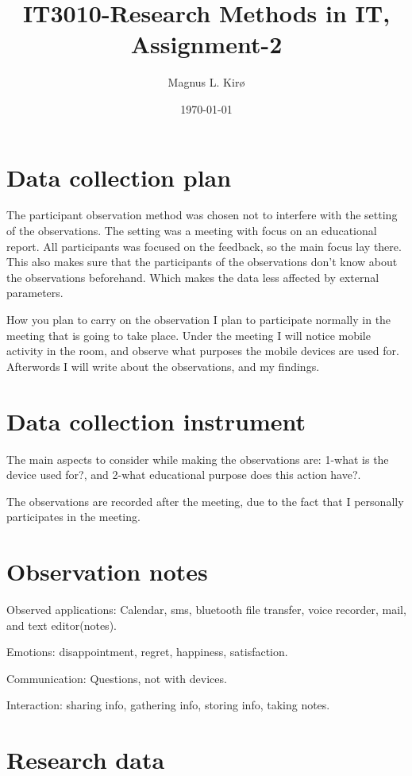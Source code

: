 \documentclass[12pt, a4paper]{article}
\title{
	IT3010-Research Methods in IT, Assignment-2
}
\author{
	Magnus L. Kirø
}
\date{\today}
\begin{document}
\maketitle
{}

\section{Data collection plan}
The participant observation method was chosen not to interfere with the setting
of the observations. The setting was a meeting with focus on an educational
report. All participants was focused on the feedback, so the main focus lay
there. This also makes sure that the participants of the observations don't
know about the observations beforehand. Which makes the data less affected by
external parameters. 

How you plan to carry on the observation
I plan to participate normally in the meeting that is going to take place.
Under the meeting I will notice mobile activity in the room, and observe what
purposes the mobile devices are used for. Afterwords I will write about the observations, and my findings.  

\section{Data collection instrument}

The main aspects to consider while making the observations are: 
1-what is the device used for?, and 2-what educational purpose does this action
have?. 

The observations are recorded after the meeting, due to the fact that I
personally participates in the meeting.

\section{Observation notes}
Observed applications:
Calendar, sms, bluetooth file transfer, voice recorder, mail, and text
editor(notes).

Emotions: disappointment, regret, happiness, satisfaction.

Communication: Questions, not with devices.  

Interaction: sharing info, gathering info, storing info, taking notes.

\section{Research data}
\end{document}
